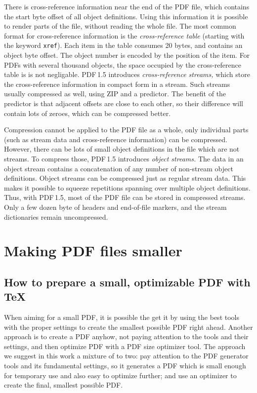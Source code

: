 \documentclass{ltugproc}
\begin{document}
There is cross-reference information near the end of the PDF file, which
contains the start byte offset of all object definitions. Using this
information it is possible to render parts of the file, without reading the
whole file. The most common format for cross-reference information is the
\emph{cross-reference table} (starting with the keyword \texttt{xref}). Each item
in the table consumes 20 bytes, and contains an object byte offset. The
object number is encoded by the position of the item. For PDFs with several
thousand objects, the space occupied by the cross-reference table is is not
negligable. PDF\,1.5 introduces \emph{cross-reference streams,} which store
the cross-reference information in compact form in a stream. Such streams
usually compressed as well, using ZIP and a predictor. The benefit of the
predictor is that adjacent offsets are close to each other, so their
difference will contain lots of zeroes, which can be compressed better.

Compression cannot be applied to the PDF file as a whole, only individual
parts (such as stream data and cross-reference information) can be
compressed. However, there can be lots of small object definitions in the
file which are not streams. To compress those, PDF\,1.5 introduces
\emph{object streams.} The data in an object stream contains a concatenation
of any number of non-stream object definitions. Object streams can be
compressed just as regular stream data. This makes it possible to squeeze
repetitions spanning over multiple object definitions. Thus, with PDF\,1.5,
most of the PDF file can be stored in compressed streams. Only a few dozen
byte of headers and end-of-file markers, and the stream dictionaries remain
uncompressed.

\section{Making PDF files smaller}

\subsection{How to prepare a small, optimizable PDF with \TeX{}}\label{tex-to-pdf}

When aiming for a small PDF, it is possible the get it by using the best
tools with the proper settings to create the smallest possible PDF right
ahead. Another approach is to create a PDF anyhow, not paying attention to
the tools and their settings, and then optimize PDF with a PDF size
optimizer tool. The approach we suggest in this work a mixture of to two:
pay attention to the PDF generator tools and its fundamental settings, so it
generates a PDF which is small enough for temporary use and also
easy to optimize further; and use an optimizer to create the final, smallest
possible PDF.
\end{document}
